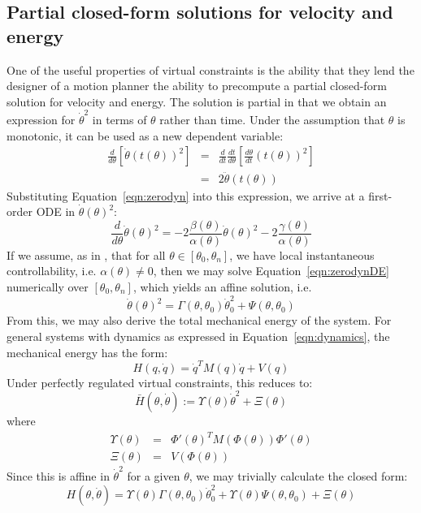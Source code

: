\subsection{Partial closed-form solutions for velocity and energy}
One of the useful properties of virtual constraints is the ability that they lend the designer of a motion planner the ability to precompute a partial closed-form solution for velocity and energy. The solution is partial in that we obtain an expression for $\dot{\theta}^2$ in terms of $\theta$ rather than time. Under the assumption that $\theta$ is monotonic, it can be used as a new dependent variable:
\begin{eqnarray}
	\frac{d}{d\theta}\left[\dot{\theta}\left(t(\theta)\right)^2\right] &=& 
	\frac{d}{dt}\frac{dt}{d\theta}\left[\frac{d\theta}{dt}\left(t(\theta)\right)^2\right] \nonumber \\ 
	&=& 2\ddot{\theta}\left(t(\theta)\right)
\end{eqnarray}
Substituting Equation~\ref{eqn:zerodyn} into this expression, we arrive at a first-order ODE in $\dot{\theta}(\theta)^2$:
\begin{equation}\label{eqn:zerodynDE}
	\frac{d}{d\theta}\dot{\theta}(\theta)^2 = -2\frac{\beta(\theta)}{\alpha(\theta)}
		\dot{\theta}(\theta)^2 - 2\frac{\gamma(\theta)}{\alpha(\theta)}
\end{equation}
If we assume, as in \cite{manchester13planning}, that for all $\theta \in [\theta_0, \theta_n]$, we have local instantaneous controllability, i.e. $\alpha(\theta) \neq 0$, then we may solve Equation~\ref{eqn:zerodynDE} numerically over $[\theta_0, \theta_n]$, which yields an affine solution, i.e.
\begin{equation}
	\dot{\theta}(\theta)^2 = \Gamma(\theta, \theta_0)\dot{\theta}_0^2 + \Psi(\theta, \theta_0)
\end{equation}
From this, we may also derive the total mechanical energy of the system. For general systems with dynamics as expressed in Equation~\ref{eqn:dynamics}, the mechanical energy has the form:
\begin{equation}
	H\left(q,\dot{q}\right) = \dot{q}^TM(q)\dot{q} + V(q)
\end{equation}
Under perfectly regulated virtual constraints, this reduces to:
\begin{equation}
	\bar{H}\left(\theta,\dot{\theta}\right) := \Upsilon(\theta)\dot{\theta}^2 + \Xi(\theta)
\end{equation}
where
\begin{eqnarray*}
	\Upsilon(\theta) &=& \Phi'(\theta)^TM\left(\Phi(\theta)\right)\Phi'(\theta) \\
	\Xi(\theta) &=& V\left(\Phi(\theta)\right)
\end{eqnarray*}
Since this is affine in $\dot{\theta}^2$ for a given $\theta$, we may trivially calculate the closed form:
\begin{equation}
	H\left(\theta, \dot{\theta}\right) =
	\Upsilon(\theta)\Gamma\left(\theta,\theta_0\right)\dot{\theta}_0^2 +
	\Upsilon(\theta)\Psi\left(\theta,\theta_0\right) + \Xi(\theta)
\end{equation}

